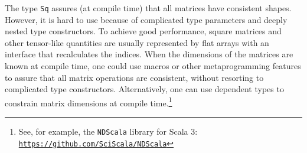 The type \lstinline!Sq! assures (at compile time) that all matrices
have consistent shapes. However, it is hard to use because of complicated
type parameters and deeply nested type constructors. To achieve good
performance, square matrices and other tensor-like quantities are
usually represented by flat arrays with an interface that recalculates
the indices. When the dimensions of the matrices are known at compile
time, one could use macros or other metaprogramming features to assure
that all matrix operations are consistent, without resorting to complicated
type constructors. Alternatively, one can use dependent types to constrain
matrix dimensions at compile time.\footnote{See, for example, the \texttt{NDScala} library for Scala 3: \texttt{\href{https://github.com/SciScala/NDScala}{https://github.com/SciScala/NDScala}}}


